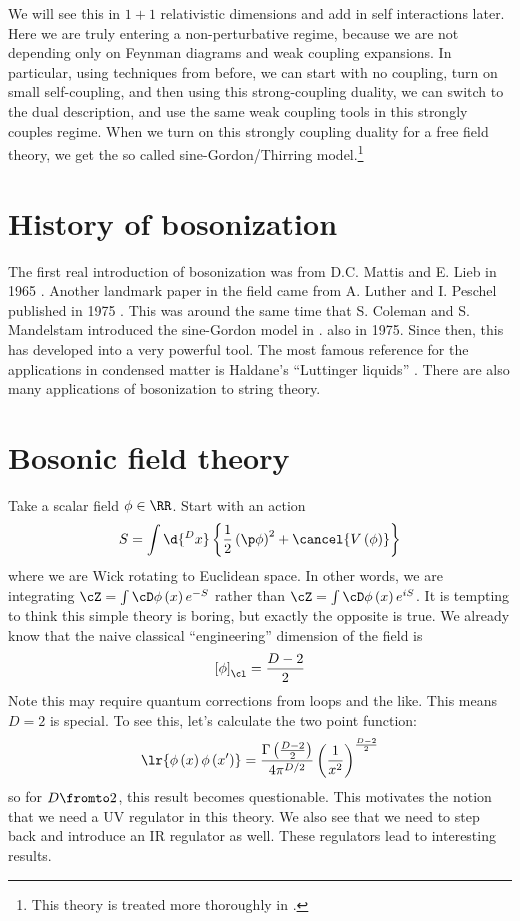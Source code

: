 \documentclass{booc}
\begin{document}
We will see this in 
$1+1$ relativistic dimensions
and add in self interactions later.
Here we are truly entering a non-perturbative regime, 
because we are not depending only on Feynman
diagrams and weak coupling expansions.
In particular, using techniques from before, 
we can start with no coupling, turn on small self-coupling, 
and then using this strong-coupling duality, we can switch
to the dual description, 
and use the same weak coupling tools in this strongly couples regime.
When we turn on this strongly coupling duality for a free field theory,
we get the so called sine-Gordon/Thirring model.\footnote{
This theory is treated more thoroughly in \cite{coleman_symmetry}.}

\section{History of bosonization}

The first real introduction of bosonization was from D.C. Mattis and E. Lieb
in 1965 
\cite{mattis_lieb}.
Another landmark paper in the field came from
A. Luther and I. Peschel published in 1975 \cite{luther_peschel}.
This was around the same time that S. Coleman and S. Mandelstam introduced
the sine-Gordon model in \cite{mandelstam_1975}.
also in 1975.
Since then, this has developed into a very powerful tool. 
The most famous reference for the applications in condensed matter
is Haldane's 
``Luttinger liquids''
\cite{haldane}.
There are also many applications of bosonization to string theory.

\section{Bosonic field theory}

Take a scalar field $\phi \in \RR$.
Start with an action
\begin{equation}
S = \int \d{^D x} \left\{ 
\frac{1}{2} \left( \p \phi \right)^2
+ \cancel{V\left( \phi \right)}
\right\}
\end{equation}
where we are Wick rotating to Euclidean space.
In other words, we are integrating 
$\cZ = \int \cD \phi\left( x \right) e^{-S}$ 
rather than 
$\cZ = \int \cD \phi\left( x \right) e^{iS}$.
It is tempting to think this simple theory is boring, but exactly
the opposite is true.
We already know that the naive classical ``engineering'' dimension of the field is 
\begin{equation}
\left[ \phi \right]_\cl = \frac{D-2}{2} 
\end{equation}
Note this may require quantum corrections from loops and the like.
This means $D = 2$ is special. 
To see this, let's calculate the two point function:
\begin{equation}
\lr{\phi\left( x \right) \phi\left( x' \right)} = 
\frac{
\Gamma\left( \frac{D - 2}{2} \right)
}{
4\pi^{D /2}
}
\left( 
\frac{1}{x^2}
\right)^{\frac{D-2}{2}}
\end{equation}
so for $D \fromto 2$, this result becomes questionable.
This motivates the notion that we need a UV regulator in this theory. 
We also see that we need to step back and introduce an IR regulator as well.
These regulators lead to interesting results.
\end{document}
